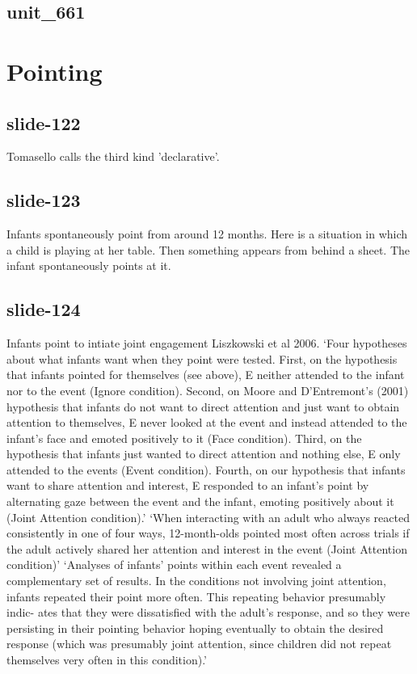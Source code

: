 \documentclass[12pt,\papersize]{extarticle}
\begin{document}
 
\subsection{unit\_661}
 
\section{Pointing}
 
 
\subsection{slide-122}
Tomasello calls the third kind 'declarative'.
 
 
\subsection{slide-123}
Infants spontaneously point from around 12 months.
Here is a situation in which a child is playing at her table. Then something appears from behind a sheet. The infant spontaneously points at it.
 
 
\subsection{slide-124}
Infants point to intiate joint engagement Liszkowski et al 2006.
‘Four hypotheses about what infants want when they point were tested. First, on the hypothesis that infants pointed for themselves (see above), E neither attended to the infant nor to the event (Ignore condition). Second, on Moore and D’Entremont’s (2001) hypothesis that infants do not want to direct attention and just want to obtain attention to themselves, E never looked at the event and instead attended to the infant’s face and emoted positively to it (Face condition). Third, on the hypothesis that infants just wanted to direct attention and nothing else, E only attended to the events (Event condition). Fourth, on our hypothesis that infants want to share attention and interest, E responded to an infant’s point by alternating gaze between the event and the infant, emoting positively about it (Joint Attention condition).’ \citep{Liszkowski:2007mm}
‘When interacting with an adult who always reacted consistently in one of four ways, 12-month-olds pointed most often across trials if the adult actively shared her attention and interest in the event (Joint Attention condition)’ \citep[p.\ 305]{liszkowski:2004_twelve}
‘Analyses of infants’ points within each event revealed a complementary set of results. In the conditions not involving joint attention, infants repeated their point more often. This repeating behavior presumably indic- ates that they were dissatisfied with the adult’s response, and so they were persisting in their pointing behavior hoping eventually to obtain the desired response (which was presumably joint attention, since children did not repeat themselves very often in this condition).’ \citep{Liszkowski:2007mm}
 
\end{document}
